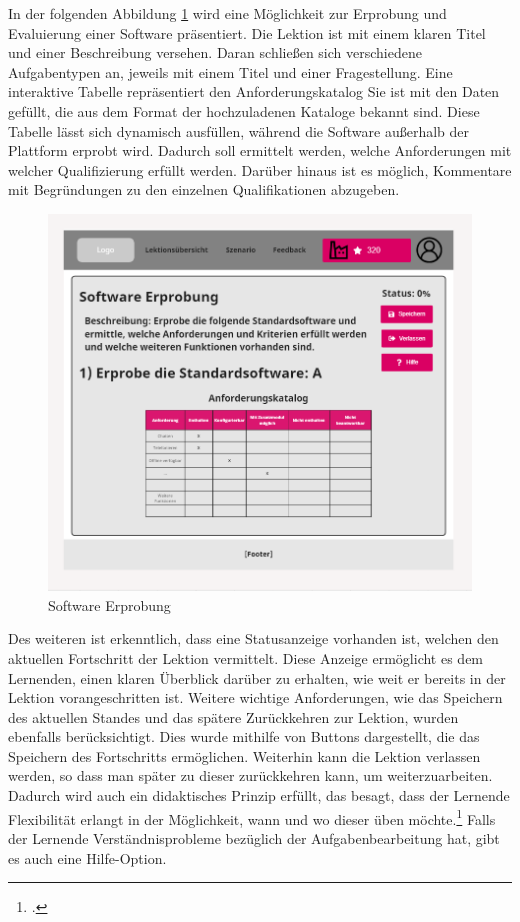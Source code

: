 In der folgenden Abbildung \ref{fig:Software-Erprobung-1} wird eine Möglichkeit zur Erprobung und Evaluierung einer Software präsentiert.
Die Lektion ist mit einem klaren Titel und einer Beschreibung versehen. Daran schließen sich verschiedene Aufgabentypen an, jeweils mit einem Titel und einer Fragestellung.
Eine interaktive Tabelle repräsentiert den Anforderungskatalog
Sie ist mit den Daten gefüllt, die aus dem Format der hochzuladenen Kataloge bekannt sind. 
Diese Tabelle lässt sich dynamisch ausfüllen, während die Software außerhalb der Plattform erprobt wird.
Dadurch soll ermittelt werden, welche Anforderungen mit welcher Qualifizierung erfüllt werden.
Darüber hinaus ist es möglich, Kommentare mit Begründungen zu den einzelnen Qualifikationen abzugeben.

\begin{figure}[H]
    \centering
    \includegraphics[width=1.0\textwidth]{assets/screenshots/mockups/Software-Erprobung-1.png}
    \caption{Software Erprobung}
    \label{fig:Software-Erprobung-1}
\end{figure}

Des weiteren ist erkenntlich, dass eine Statusanzeige vorhanden ist, welchen den aktuellen Fortschritt der Lektion vermittelt. Diese Anzeige ermöglicht es dem Lernenden, einen klaren Überblick darüber zu erhalten, wie weit er bereits in der Lektion vorangeschritten ist.
Weitere wichtige Anforderungen, wie das Speichern des aktuellen Standes und das spätere Zurückkehren zur Lektion, wurden ebenfalls berücksichtigt. Dies wurde mithilfe von Buttons dargestellt, die das Speichern des Fortschritts ermöglichen. Weiterhin kann die Lektion verlassen werden, so dass man später zu dieser zurückkehren kann, um weiterzuarbeiten. 
Dadurch wird auch ein didaktisches Prinzip erfüllt, das besagt, dass der Lernende Flexibilität erlangt in der Möglichkeit, wann und wo dieser üben möchte.\footcite[Vgl.][S.2]{Minkovska.2016}{}{}
Falls der Lernende Verständnisprobleme bezüglich der Aufgabenbearbeitung hat, gibt es auch eine Hilfe-Option. 

